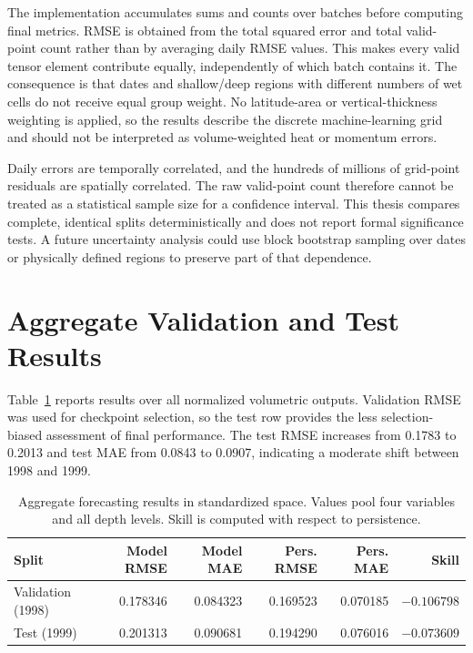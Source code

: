 The implementation accumulates sums and counts over batches before computing final metrics. RMSE is obtained from the total squared error and total valid-point count rather than by averaging daily RMSE values. This makes every valid tensor element contribute equally, independently of which batch contains it. The consequence is that dates and shallow/deep regions with different numbers of wet cells do not receive equal group weight. No latitude-area or vertical-thickness weighting is applied, so the results describe the discrete machine-learning grid and should not be interpreted as volume-weighted heat or momentum errors.

Daily errors are temporally correlated, and the hundreds of millions of grid-point residuals are spatially correlated. The raw valid-point count therefore cannot be treated as a statistical sample size for a confidence interval. This thesis compares complete, identical splits deterministically and does not report formal significance tests. A future uncertainty analysis could use block bootstrap sampling over dates or physically defined regions to preserve part of that dependence.

\section{Aggregate Validation and Test Results}

Table~\ref{tab:overall-results} reports results over all normalized volumetric outputs. Validation RMSE was used for checkpoint selection, so the test row provides the less selection-biased assessment of final performance. The test RMSE increases from 0.1783 to 0.2013 and test MAE from 0.0843 to 0.0907, indicating a moderate shift between 1998 and 1999.

\begin{table}[htbp]
\centering
\small
\caption{Aggregate forecasting results in standardized space. Values pool four variables and all depth levels. Skill is computed with respect to persistence.}
\label{tab:overall-results}
\begin{tabular}{lrrrrr}
\toprule
Split & Model RMSE & Model MAE & Pers. RMSE & Pers. MAE & Skill \\
\midrule
Validation (1998) & 0.178346 & 0.084323 & 0.169523 & 0.070185 & $-0.106798$ \\
Test (1999) & 0.201313 & 0.090681 & 0.194290 & 0.076016 & $-0.073609$ \\
\bottomrule
\end{tabular}
\end{table}


